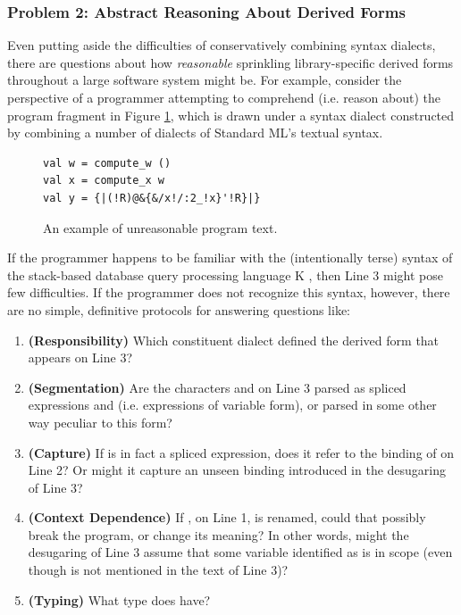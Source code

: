 \subsubsection{Problem 2: Abstract Reasoning About Derived Forms}\label{sec:abs-reasoning-intro}
Even putting aside the difficulties of conservatively combining syntax dialects, there are questions about how \emph{reasonable}  sprinkling library-specific derived forms throughout a large software system might be. 
For example, consider the perspective of a programmer attempting to comprehend (i.e. reason about) the program fragment in Figure \ref{fig:K-dialect}, which is drawn under a syntax dialect constructed by combining a number of dialects of Standard ML's textual syntax.

\begin{figure}[h]
\begin{lstlisting}
val w = compute_w ()
val x = compute_x w
val y = {|(!R)@&{&/x!/:2_!x}'!R}|}
\end{lstlisting}
\caption{An example of unreasonable program text.}
\label{fig:K-dialect}
\end{figure}

If the programmer happens to be familiar with the (intentionally terse) syntax of the stack-based database query processing language K \cite{Whitney:2001:LOR:376284.375783}, then Line 3 might pose few difficulties. If the programmer does not recognize this syntax, however, there are no simple, definitive protocols for answering questions like:
\begin{enumerate}
\item \textbf{(Responsibility)} Which constituent dialect defined the derived form that appears on Line 3?
\item \textbf{(Segmentation)} Are the characters  and  on Line 3 parsed as spliced expressions  and  (i.e. expressions of variable form), or parsed in some other way peculiar to this form?
\item \textbf{(Capture)} If  is in fact a spliced expression, does it refer to the binding of  on Line 2? Or might it capture an unseen binding introduced in the desugaring of Line 3?
\item \textbf{(Context Dependence)} If , on Line 1, is renamed, could that possibly break the program, or change its meaning? In other words, might the desugaring of Line 3 assume that some variable identified as  is in scope (even though  is not mentioned in the text of Line 3)?
\item \textbf{(Typing)} What type does  have?
\end{enumerate}

